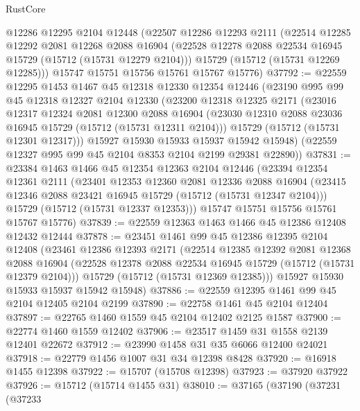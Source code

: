 \begin{lexlean}{RustCore}
\begin{coremodule}
    @12286
    @12295
    @2104
    @12448
    (@22507
      @12286
      @12293
      @2111
      (@22514
        @12285
        @12292
        @2081
        @12268
        @2088
        @16904
        (@22528 @12278 @2088 @22534 @16945 @15729 (@15712 (@15731 @12279 @2104)))
        @15729
        (@15712 (@15731 @12269 @12285)))
      @15747
      @15751
      @15756
      @15761
      @15767
      @15776)
@37792 := @22559
    @12295
    @1453
    @1467
    @45
    @12318
    @12330
    @12354
    @12446
    (@23190
      @995
      @99
      @45
      @12318
      @12327
      @2104
      @12330
      (@23200
        @12318
        @12325
        @2171
        (@23016
          @12317
          @12324
          @2081
          @12300
          @2088
          @16904
          (@23030 @12310 @2088 @23036 @16945 @15729 (@15712 (@15731 @12311 @2104)))
          @15729
          (@15712 (@15731 @12301 @12317)))
        @15927
        @15930
        @15933
        @15937
        @15942
        @15948)
      (@22559 @12327 @995 @99 @45 @2104 @8353 @2104 @2199 @29381 @22890))
@37831 := @23384
    @1463
    @1466
    @45
    @12354
    @12363
    @2104
    @12446
    (@23394
      @12354
      @12361
      @2111
      (@23401
        @12353
        @12360
        @2081
        @12336
        @2088
        @16904
        (@23415 @12346 @2088 @23421 @16945 @15729 (@15712 (@15731 @12347 @2104)))
        @15729
        (@15712 (@15731 @12337 @12353)))
      @15747
      @15751
      @15756
      @15761
      @15767
      @15776)
@37839 := @22559 @12363 @1463 @1466 @45 @12386 @12408 @12432 @12444
@37878 := @23451
    @1461
    @99
    @45
    @12386
    @12395
    @2104
    @12408
    (@23461
      @12386
      @12393
      @2171
      (@22514
        @12385
        @12392
        @2081
        @12368
        @2088
        @16904
        (@22528 @12378 @2088 @22534 @16945 @15729 (@15712 (@15731 @12379 @2104)))
        @15729
        (@15712 (@15731 @12369 @12385)))
      @15927
      @15930
      @15933
      @15937
      @15942
      @15948)
@37886 := @22559 @12395 @1461 @99 @45 @2104 @12405 @2104 @2199
@37890 := @22758 @1461 @45 @2104 @12404
@37897 := @22765 @1460 @1559 @45 @2104 @12402 @2125 @1587
@37900 := @22774 @1460 @1559 @12402
@37906 := @23517 @1459 @31 @1558 @2139 @12401 @22672
@37912 := @23990 @1458 @31 @35 @6066 @12400 @24021
@37918 := @22779 @1456 @1007 @31 @34 @12398 @8428
@37920 := @16918 @1455 @12398
@37922 := @15707 (@15708 @12398)
@37923 := @37920 @37922
@37926 := @15712 (@15714 @1455 @31)
@38010 := @37165
    (@37190
      (@37231
        (@37233

\end{coremodule}
\end{lexlean}
